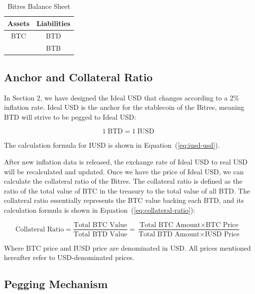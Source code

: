 \documentclass{article}
\begin{document}
\begin{table}[h]
\centering
\caption{Bitres Balance Sheet}
\label{tab:brs-balance}
\begin{tabular}{c|c}
\toprule
Assets & Liabilities \\
\midrule
BTC & BTD \\
& BTB \\
\bottomrule
\end{tabular}
\end{table}

\subsection{Anchor and Collateral Ratio}

In Section 2, we have designed the Ideal USD that changes according to a 2\% inflation rate. Ideal USD is the anchor for the stablecoin of the Bitres, meaning BTD will strive to be pegged to Ideal USD:

\begin{equation}
1 \;\text{BTD} =1 \;\text{IUSD}
\label{eq:btd-iusd}
\end{equation}

The calculation formula for IUSD is shown in Equation~(\ref{eq:iusd-usd}).

After new inflation data is released, the exchange rate of Ideal USD to real USD will be recalculated and updated. Once we have the price of Ideal USD, we can calculate the collateral ratio of the Bitres. The collateral ratio is defined as the ratio of the total value of BTC in the treasury to the total value of all BTD. The collateral ratio essentially represents the BTC value backing each BTD, and its calculation formula is shown in Equation~(\ref{eq:collateral-ratio}):

\begin{equation}
\text{Collateral Ratio} = \frac{\text{Total BTC Value}}{\text{Total BTD Value}} = \frac{\text{Total BTC Amount} \times \text{BTC Price}}{\text{Total BTD Amount} \times \text{IUSD Price}}
\label{eq:collateral-ratio}
\end{equation}

Where BTC price and IUSD price are denominated in USD. All prices mentioned hereafter refer to USD-denominated prices.

\subsection{Pegging Mechanism}
\end{document}
